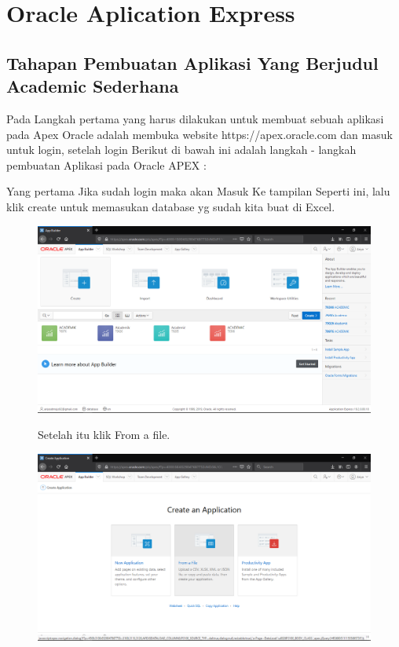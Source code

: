 \chapter{Oracle Aplication Express}

\section{Tahapan Pembuatan Aplikasi Yang Berjudul Academic Sederhana}
Pada Langkah pertama yang harus dilakukan untuk membuat sebuah aplikasi pada Apex Oracle adalah membuka website https://apex.oracle.com dan masuk untuk login, setelah login Berikut di bawah ini adalah langkah - langkah pembuatan Aplikasi pada Oracle APEX :

\begin{enumerate}
\item[1]Yang pertama Jika sudah login maka akan Masuk Ke tampilan Seperti ini, lalu klik create untuk memasukan database yg sudah kita buat di Excel.

\begin{figure}[!htbp]
    \begin{center}
    \includegraphics[scale=0.2]{figures/1.png}
    \caption{\textit{}}
    \end{center}   
    \end{figure}
    
\begin{figure}[!htbp]
\item[2]Setelah itu klik From a file.

    \begin{center}
    \includegraphics[scale=0.2]{figures/2.png}
    \caption{\textit{}}
    \end{center}



\end{figure}
\end{enumerate}
